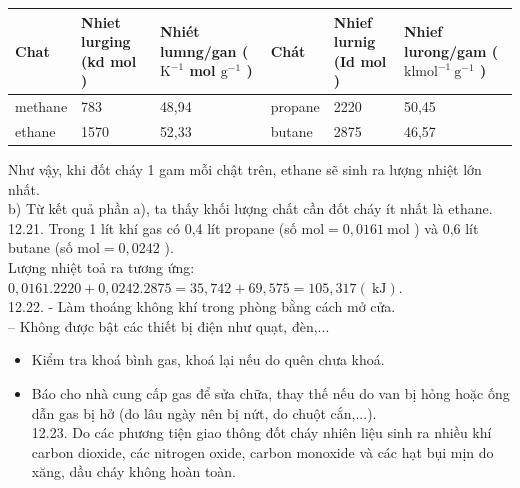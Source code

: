 \documentclass[10pt]{article}
\begin{document}
\begin{center}
\begin{tabular}{|l|l|l|l|l|l|}
\hline
Chat & Nhiet lurging (kd mol ) & Nhiét lumng/gan ( $\mathrm{K}^{-1}$ mol $\mathrm{g}^{-1}$ ) & Chát & Nhief lurnig (Id mol ) & Nhief lurong/gam ( $\mathrm{kl} \mathrm{mol}^{-1} \mathrm{~g}^{-1}$ ) \\
\hline
methane & 783 & 48,94 & propane & 2220 & 50,45 \\
\hline
ethane & 1570 & 52,33 & butane & 2875 & 46,57 \\
\hline
\end{tabular}
\end{center}

Như vậy, khi đốt cháy 1 gam mỗi chật trên, ethane sẽ sinh ra lượng nhiệt lớn nhất.\\
b) Từ kết quả phần a), ta thấy khối lượng chất cần đốt cháy ít nhất là ethane.\\
12.21. Trong 1 lít khí gas có 0,4 lít propane (số $\mathrm{mol}=0,0161 \mathrm{~mol}$ ) và 0,6 lít butane (số $\mathrm{mol}=0,0242$ ).\\
Lượng nhiệt toả ra tương ứng:\\
$0,0161.2220+0,0242.2875=35,742+69,575=105,317(\mathrm{~kJ})$.\\
12.22. - Làm thoáng không khí trong phòng bằng cách mở cửa.\\
-- Không được bật các thiết bị điện như quạt, đèn,...

\begin{itemize}
  \item Kiểm tra khoá bình gas, khoá lại nếu do quên chưa khoá.
  \item Báo cho nhà cung cấp gas để sửa chữa, thay thế nếu do van bị hỏng hoặc ống dẫn gas bị hở (do lâu ngày nên bị nứt, do chuột cắn,...).\\
12.23. Do các phương tiện giao thông đốt cháy nhiên liệu sinh ra nhiều khí carbon dioxide, các nitrogen oxide, carbon monoxide và các hạt bụi mịn do xăng, dầu cháy không hoàn toàn.
\end{itemize}
\end{document}
